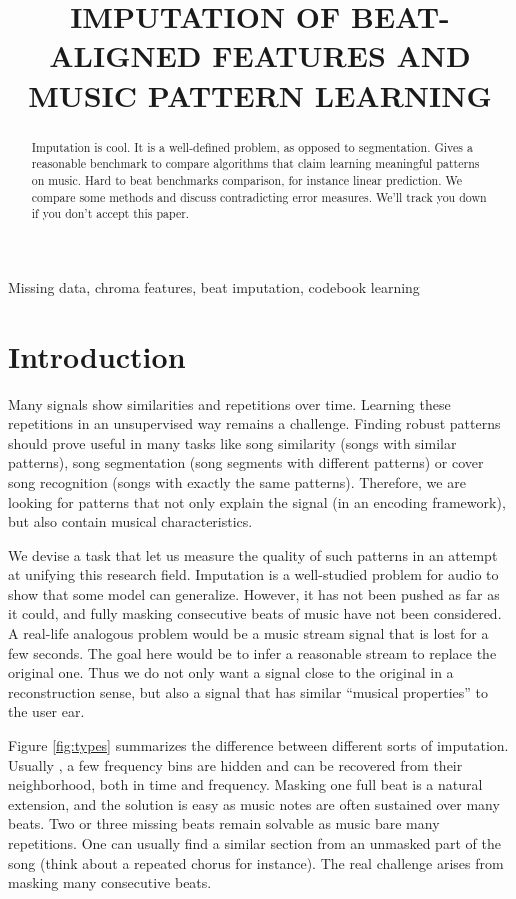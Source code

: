 \documentclass{article}
\title{IMPUTATION OF BEAT-ALIGNED FEATURES AND MUSIC PATTERN LEARNING}
\begin{document}
%
\maketitle
%
\begin{abstract}
Imputation is cool. It is a well-defined problem, as opposed to segmentation.
Gives a reasonable benchmark to compare algorithms that claim learning meaningful
patterns on music. Hard to beat benchmarks comparison, for instance linear
prediction. We compare some methods and discuss contradicting error measures. 
We'll track you down if you don't accept this paper.
\end{abstract}
%
\begin{keywords}
Missing data, chroma features, beat imputation, codebook learning
\end{keywords}
%
\section{Introduction}
\label{sec:intro}
Many signals show similarities and repetitions over time. Learning these repetitions
in an unsupervised way remains a challenge. Finding robust patterns should prove useful in
many tasks like song similarity (songs with similar patterns), song segmentation
(song segments with different patterns) or cover song recognition (songs with exactly
the same patterns).
Therefore, we are looking for patterns that not only explain the signal (in an encoding
framework), but also contain musical characteristics. 

We devise a task that let us measure
the quality of such patterns in an attempt at unifying this research field.
Imputation is a well-studied problem for audio to show that some model can generalize.
However, it has not been pushed as far as it could, and fully masking consecutive beats
of music have not been considered. A real-life analogous problem would be a music stream
signal that is lost for a few seconds. The goal here would be to infer a reasonable
stream to replace the original one. Thus we do not only want a signal close to the original
in a reconstruction sense, but also a signal that has similar ``musical properties'' to
the user ear.

Figure \ref{fig:types} summarizes the difference between different sorts of imputation.
Usually \cite{Smaragdis2009}, a few frequency bins are hidden and can be recovered from
their neighborhood, both in time and frequency. Masking one full beat is a natural extension,
and the solution is easy as music notes are often sustained over many beats. Two or three
missing beats remain solvable as music bare many repetitions. One can usually find a similar
section from an unmasked part of the song (think about a repeated chorus for instance).
The real challenge arises from masking many consecutive beats.
\end{document}

